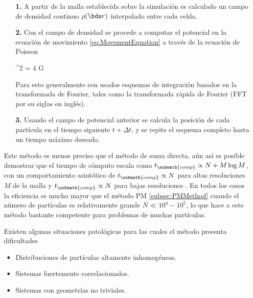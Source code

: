 \begin{itemize}
\item[\textbf{1.}] A partir de la malla establecida sobre la simulación es
calculado un campo de densidad continuo $\rho(\bds r)$ interpolado entre 
cada celda.

\item[\textbf{2.}] Con el campo de densidad se procede a computar el 
potencial en la ecuación de movimiento \ref{eq:MovementEquation} a través 
de la ecuación de Poisson


{ \nabla^2 \phi = 4 \pi G \rho }


Para esto generalmente son usados esquemas de integración basados en la
transformada de Fourier, tales como la transformada rápida de Fourier 
(FFT por su siglas en inglés).

\item[\textbf{3.}] Usando el campo de potencial anterior se calcula la 
posición de cada partícula en el tiempo siguiente $t+\Delta t$, y se 
repite el esquema completo hasta un tiempo máximo deseado.

\end{itemize}


Este método es menos preciso que el método de suma directa, aún así es 
posible demostrar que el tiempo de cómputo escala como $t_{\submath{comp}} 
\propto N + M \log M$, con un comportamiento asintótico de 
$t_{\submath{comp}} \propto N$ para altas resoluciones $M$ de la malla y 
$t_{\submath{comp}} \propto N$ para bajas resoluciones \cite{pfalzner1996}.
En todos los casos la eficiencia es mucho mayor que el método PM 
\ref{subsec:PMMethod} cuando el número de partículas es relativamente 
grande $N\ll 10^4 - 10^5$, lo que hace a este método bastante competente 
para problemas de muchas partículas.


Existen algunas situaciones patológicas para las cuales el método presenta
dificultades \cite{pfalzner1996}


\begin{itemize}
\item Distribuciones de partículas altamente inhomogéneas.
\item Sistemas fuertemente correlacionados.
\item Sistemas con geometrías no triviales.
\end{itemize}


